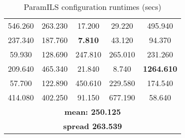 \begin{table}[h]
\centering
\renewcommand{\arraystretch}{1.2}
\begin{tabular}{|ccccc|}
	\hline
	546.260 & 263.230 & 17.200 & 29.220 & 495.940 \\ 
	237.340 & 187.760 & \textcolor{naranja}{\bf 7.810} & 43.120 & 94.370 \\  
	\hline 
	59.930 & 128.690 & 247.810 & 265.010 & 231.260 \\ 
	209.640 & 465.340 & 21.840 & 8.740 & \textcolor{intenso}{\bf 1264.610} \\  
	\hline 
	57.700 & 122.890 & 450.610 & 229.580 & 174.540 \\ 
	414.080 & 402.250 & 91.150 & 677.190 & 58.640 \\  
	\hline 
	\multicolumn{5}{|c|}{\bf mean: 250.125}\\
	\multicolumn{5}{|c|}{\bf spread 263.539}\\
	\hline
\end{tabular}
\caption{ParamILS configuration runtimes (secs)}\label{table:testcagood}
\end{table}    
%
%
%
%
%
%
